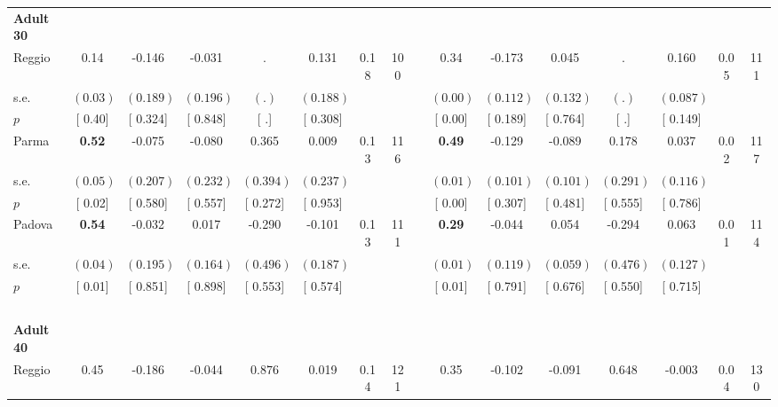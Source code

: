 \begin{longtable}{L{8em} c c c c c c c p{1em} c c c c c c c}
\quad \quad \textbf{Adult 30} & & & & & & & & & & & & & & & \\* 
\quad \quad \quad Reggio& 0.14 &    -0.146 &    -0.031 &         . &     0.131 &      0.18 &       100 & & 0.34 &    -0.173 &     0.045 &         . &     0.160 &      0.05 &       111  \\*
\quad \quad \quad \quad s.e.& $ (     0.03)$ & $ (    0.189)$ & $ (    0.196)$ & $ (        .)$ & $ (    0.188)$ & & & & $ (     0.00)$ & $ (    0.112)$ & $ (    0.132)$ & $ (        .)$ & $ (    0.087)$ & &  \\*
\quad \quad \quad \quad $ p$ & [     0.40] & [    0.324] & [    0.848] & [        .] & [    0.308] & & & & [     0.00] & [    0.189] & [    0.764] & [        .] & [    0.149] & &  \\[1em]
\quad \quad \quad Parma& \textbf{     0.52} &    -0.075 &    -0.080 &     0.365 &     0.009 &      0.13 &       116 & & \textbf{     0.49} &    -0.129 &    -0.089 &     0.178 &     0.037 &      0.02 &       117  \\*
\quad \quad \quad \quad s.e.& $ (     0.05)$ & $ (    0.207)$ & $ (    0.232)$ & $ (    0.394)$ & $ (    0.237)$ & & & & $ (     0.01)$ & $ (    0.101)$ & $ (    0.101)$ & $ (    0.291)$ & $ (    0.116)$ & &  \\*
\quad \quad \quad \quad $ p$ & [     0.02] & [    0.580] & [    0.557] & [    0.272] & [    0.953] & & & & [     0.00] & [    0.307] & [    0.481] & [    0.555] & [    0.786] & &  \\[1em]
\quad \quad \quad Padova& \textbf{     0.54} &    -0.032 &     0.017 &    -0.290 &    -0.101 &      0.13 &       111 & & \textbf{     0.29} &    -0.044 &     0.054 &    -0.294 &     0.063 &      0.01 &       114  \\*
\quad \quad \quad \quad s.e.& $ (     0.04)$ & $ (    0.195)$ & $ (    0.164)$ & $ (    0.496)$ & $ (    0.187)$ & & & & $ (     0.01)$ & $ (    0.119)$ & $ (    0.059)$ & $ (    0.476)$ & $ (    0.127)$ & &  \\*
\quad \quad \quad \quad $ p$ & [     0.01] & [    0.851] & [    0.898] & [    0.553] & [    0.574] & & & & [     0.01] & [    0.791] & [    0.676] & [    0.550] & [    0.715] & &  \\[1em]
~\\[1em]
\quad \quad \textbf{Adult 40} & & & & & & & & & & & & & & & \\* 
\quad \quad \quad Reggio& 0.45 &    -0.186 &    -0.044 & $ \mathbf{    0.876}$ &     0.019 &      0.14 &       121 & & 0.35 &    -0.102 &    -0.091 & $ \mathbf{    0.648}$ &    -0.003 &      0.04 &       130  \\*

\end{longtable}
